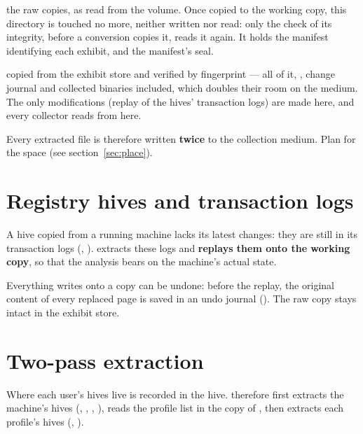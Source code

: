 \documentclass[11pt,a4paper,oneside]{report}
\begin{document}
\begin{description}[style=nextline,leftmargin=1.2em]
  \item[\fichier{exhibits/} — the exhibit store] the raw copies, as read from
        the volume. Once copied to the working copy, this directory is touched
        no more, neither written nor read: only the check of its integrity,
        before a conversion copies it, reads it again. It holds the manifest
        identifying each exhibit, and the manifest's seal.
  \item[\fichier{working/} — the working copy] copied from the exhibit store and
        verified by fingerprint — all of it, , change journal and
        collected binaries included, which doubles their room on the medium.
        The only modifications (replay of the hives' transaction logs) are made
        here, and every collector reads from here.
\end{description}

\begin{note}
Every extracted file is therefore written \textbf{twice} to the collection
medium. Plan for the space (see section~\ref{sec:place}).
\end{note}

\section{Registry hives and transaction logs}

A hive copied from a running machine lacks its latest changes: they are still in
its transaction logs (, ). \wac{} extracts these
logs and \textbf{replays them onto the working copy}, so that the analysis bears
on the machine's actual state.

Everything \wac{} writes onto a copy can be undone: before the replay, the
original content of every replaced page is saved in an undo journal
(). The raw copy stays intact in the exhibit store.

\section{Two-pass extraction}

Where each user's hives live is recorded in the  hive. \wac{}
therefore first extracts the machine's hives (,
, , ), reads the profile list in
the copy of , then extracts each profile's hives
(, ).
\end{document}
